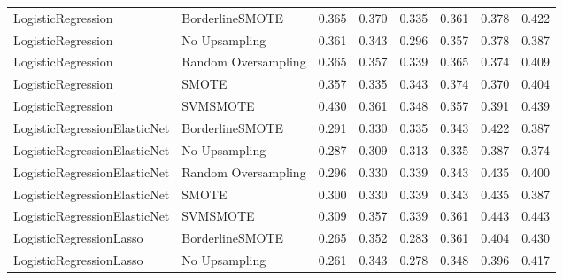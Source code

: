 \begin{tabular}{llllllll}
          LogisticRegression &     BorderlineSMOTE & 0.365 &                     0.370 &                 0.335 &                  0.361 &                                   0.378 &     0.422 \\
          LogisticRegression &       No Upsampling & 0.361 &                     0.343 &                 0.296 &                  0.357 &                                   0.378 &     0.387 \\
          LogisticRegression & Random Oversampling & 0.365 &                     0.357 &                 0.339 &                  0.365 &                                   0.374 &     0.409 \\
          LogisticRegression &               SMOTE & 0.357 &                     0.335 &                 0.343 &                  0.374 &                                   0.370 &     0.404 \\
          LogisticRegression &            SVMSMOTE & 0.430 &                     0.361 &                 0.348 &                  0.357 &                                   0.391 &     0.439 \\
LogisticRegressionElasticNet &     BorderlineSMOTE & 0.291 &                     0.330 &                 0.335 &                  0.343 &                                   0.422 &     0.387 \\
LogisticRegressionElasticNet &       No Upsampling & 0.287 &                     0.309 &                 0.313 &                  0.335 &                                   0.387 &     0.374 \\
LogisticRegressionElasticNet & Random Oversampling & 0.296 &                     0.330 &                 0.339 &                  0.343 &                                   0.435 &     0.400 \\
LogisticRegressionElasticNet &               SMOTE & 0.300 &                     0.330 &                 0.339 &                  0.343 &                                   0.435 &     0.387 \\
LogisticRegressionElasticNet &            SVMSMOTE & 0.309 &                     0.357 &                 0.339 &                  0.361 &                                   0.443 &     0.443 \\
     LogisticRegressionLasso &     BorderlineSMOTE & 0.265 &                     0.352 &                 0.283 &                  0.361 &                                   0.404 &     0.430 \\
     LogisticRegressionLasso &       No Upsampling & 0.261 &                     0.343 &                 0.278 &                  0.348 &                                   0.396 &     0.417 \\

\end{tabular}
